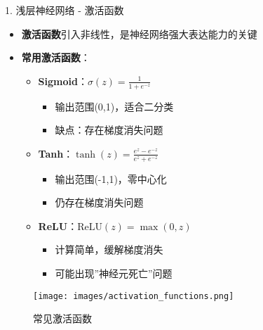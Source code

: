 \documentclass[
  ignorenonframetext,
  aspectratio=169,
  chinese-hans,
]{beamer}
\providecommand{\tightlist}{%
  \setlength{\itemsep}{0pt}\setlength{\parskip}{0pt}}\usepackage{longtable,booktabs,array}
\begin{document}
\begin{frame}{1. 浅层神经网络 - 激活函数}
\label{ux6d45ux5c42ux795eux7ecfux7f51ux7edc---ux6fc0ux6d3bux51fdux6570}
\begin{itemize}
\item
  \textbf{激活函数}引入非线性，是神经网络强大表达能力的关键
\item
  \textbf{常用激活函数}：

  \begin{itemize}
  \tightlist
  \item
    \textbf{Sigmoid}：\(\sigma(z) = \frac{1}{1 + e^{-z}}\)

    \begin{itemize}
    \tightlist
    \item
      输出范围(0,1)，适合二分类
    \item
      缺点：存在梯度消失问题
    \end{itemize}
  \item
    \textbf{Tanh}：\(\tanh(z) = \frac{e^z - e^{-z}}{e^z + e^{-z}}\)

    \begin{itemize}
    \tightlist
    \item
      输出范围(-1,1)，零中心化
    \item
      仍存在梯度消失问题
    \end{itemize}
  \item
    \textbf{ReLU}：\(\text{ReLU}(z) = \max(0, z)\)

    \begin{itemize}
    \tightlist
    \item
      计算简单，缓解梯度消失
    \item
      可能出现''神经元死亡''问题
    \end{itemize}
  \end{itemize}
\end{itemize}

\begin{figure}[H]

{\centering \texttt{[image: images/activation\_functions.png]}

}

\caption{常见激活函数}

\end{figure}%
\end{frame}
\end{document}
